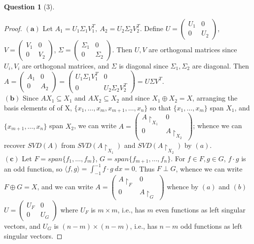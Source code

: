 \documentclass[11pt]{article}
\theoremstyle{quest}
\newtheorem*{question}{Question}
\begin{document}
\begin{question}[3]
\end{question}
\begin{proof}
$\mathbf{(a)}$ Let $A_1 = U_1 \Sigma_1 V_1^T,\ A_2 = U_2 \Sigma_2 V_2^T$. Define $U = \begin{pmatrix}
U_1 & 0 \\
0 & U_2
\end{pmatrix}$, $V = \begin{pmatrix}
V_1 & 0 \\
0 & V_2
\end{pmatrix}$, $\Sigma = \begin{pmatrix}
\Sigma_1 & 0 \\
0 & \Sigma_2
\end{pmatrix}$. Then $U, V$ are orthogonal matrices since $U_i, V_i$ are orthogonal matrices, and $\Sigma$ is diagonal since $\Sigma_1, \Sigma_2$ are diagonal. Then
\\$A = \begin{pmatrix}
A_1 & 0 \\
0 & A_2
\end{pmatrix} = \begin{pmatrix}
U_1 \Sigma_1 V_1^T & 0 \\
0 & U_2 \Sigma_2 V_2^T 
\end{pmatrix} = U \Sigma V^T$.
\\$\mathbf{(b)}$ Since $AX_1 \subseteq X_1$ and $AX_2 \subseteq X_2$ and since $X_1 \oplus X_2 = X$, arranging the basis elements of of X, $\{x_1, \ldots, x_m, x_{m+1}, \ldots, x_n\}$ so that $\{x_1, \ldots, x_m\}$ span $X_1$, and $\{x_{m+1}, \ldots, x_n\}$ span $X_2$, we can write $A = \begin{pmatrix}
A \restriction_{X_1} & 0 \\
0 & A \restriction_{X_2}
\end{pmatrix}$; whence we can recover $SVD(A)$ from $SVD(A \restriction_{X_1})$ and $SVD(A \restriction_{X_2})$ by $(a)$.
\\$\mathbf{(c)}$ Let $F = span \{f_1, \ldots, f_m\}$, $G = span \{f_{m+1}, \ldots, f_n\}$. For $f \in F, g \in G$, $f \cdot g$ is an odd function, so $\langle f, g \rangle = \int_{-1}^{-1} f \cdot g\ dx = 0$. Thus $F \perp G$, whence we can write $F \oplus G = X$, and we can write $A = \begin{pmatrix}
A \restriction_F & 0 \\
0 & A \restriction_G
\end{pmatrix}$ whence by $(a)$ and $(b)$ $U = \begin{pmatrix}
U_F & 0 \\
0 & U_G
\end{pmatrix}$ where $U_F$ is $m \times m$, i.e., has $m$ even functions as left singular vectors, and $U_G$ is $(n-m) \times (n-m)$, i.e., has $n-m$ odd functions as left singular vectors. 
\end{proof}
\end{document}
